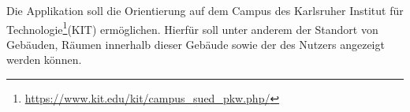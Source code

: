 
Die Applikation soll die Orientierung auf dem \Gls{Campus} des Karlsruher Institut für Technologie\footnote{\href{https://www.kit.edu/kit/campus_sued_pkw.php/}{https://www.kit.edu/kit/campus\_sued\_pkw.php/}}(\Gls{KIT})
 ermöglichen. Hierfür soll unter anderem der Standort von Gebäuden, Räumen innerhalb dieser Gebäude sowie der
 des Nutzers angezeigt werden können.
 